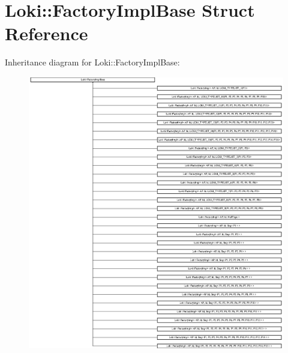\hypertarget{structLoki_1_1FactoryImplBase}{}\section{Loki\+:\+:Factory\+Impl\+Base Struct Reference}
\label{structLoki_1_1FactoryImplBase}
Inheritance diagram for Loki\+:\+:Factory\+Impl\+Base\+:\begin{figure}[H]
\begin{center}
\leavevmode
\includegraphics[height=12.000000cm]{structLoki_1_1FactoryImplBase}
\end{center}
\end{figure}

